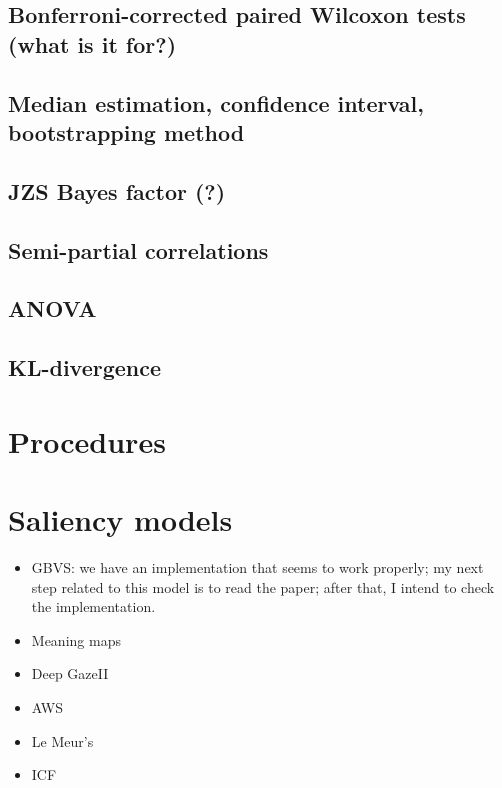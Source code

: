 \documentclass[11pt,letter]{article}
\begin{document}
\subsection{Bonferroni-corrected paired Wilcoxon tests (what is it for?)}	
\subsection{Median estimation, confidence interval, bootstrapping method}
\subsection{JZS Bayes factor (?)}
\subsection{Semi-partial correlations}
\subsection{ANOVA}
\subsection{KL-divergence}

\section{Procedures}

\section{Saliency models}
\begin{itemize}
	\item GBVS: we have an implementation that seems to work properly; my next step related to this model is to read the paper; after that, I intend to check the implementation.
	\item Meaning maps
	\item Deep GazeII
	\item AWS
	\item Le Meur's
	\item ICF
\end{itemize}
\end{document}

